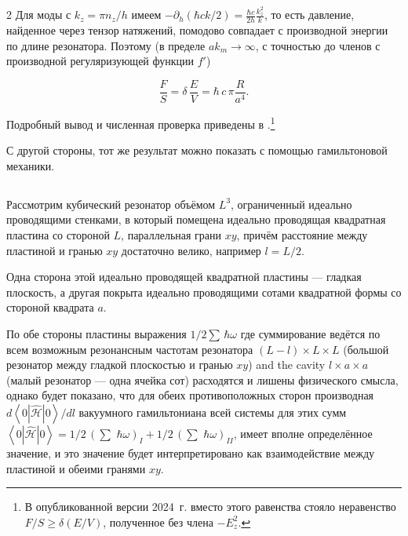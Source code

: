 \documentclass[twoside, 10pt]{article}
\def\myvspacebeforesubsection{-2.0mm}
\def\myvspaceaftersubsection{-2.5mm}
\begin{document}
\begin{multicols}{2}
Для моды с \(k_z=\pi n_z/h\) имеем
\(-\partial_h(\hbar ck/2)=\frac{\hbar c}{2h}\frac{k_z^2}{k}\), то есть давление, найденное через
тензор натяжений, помодово совпадает с производной энергии по длине резонатора. Поэтому (в пределе
\(ak_m\to\infty\), с точностью до членов с производной регуляризующей функции \(f'\))

\begin{equation}\frac{F}{S} = \delta\,\frac{E}{V} = \hbar\,c\, \pi\frac{R}{a^4}.\end{equation}

Подробный вывод и численная проверка приведены в \cite{Drozdov2026Noether, VerifNotebook}.\footnote{В опубликованной версии 2024~г. вместо этого равенства стояло неравенство \(F/S\ge\delta(E/V)\), полученное без члена \(-E_z^2\).}

С другой стороны, тот же результат можно показать с помощью гамильтоновой механики.


\vspace{\myvspacebeforesubsection}
    \subsection*{} \label{appendix-c.-hamiltonian-mechanics-approach}
\vspace{\myvspaceaftersubsection}


\setcounter{equation}{0}
\renewcommand{\theequation}{C.\arabic{equation}}

    Рассмотрим кубический резонатор объёмом \(L^3\), ограниченный идеально
проводящими стенками, в который помещена идеально проводящая квадратная пластина со стороной
\(L\), параллельная грани \(xy\), причём расстояние между пластиной и гранью \(xy\) достаточно велико, например \(l = L/2\).

Одна сторона этой идеально проводящей квадратной пластины — гладкая плоскость, а
другая покрыта идеально проводящими сотами квадратной формы со стороной квадрата \(a\).

По обе стороны пластины выражения \(1\big/2\sum\,\hbar\omega\)
где суммирование ведётся по всем возможным резонансным частотам резонатора \(\left(L-l\right)\times L\times L\) (большой резонатор между гладкой плоскостью и гранью \(xy\)) and the cavity \(l\times a\times a\) (малый резонатор — одна ячейка сот) расходятся и лишены физического смысла, однако будет показано, что для обеих противоположных сторон производная \({d\left<0|\hat{\mathcal{H}}|0\right>}\big/{dl}\) вакуумного гамильтониана всей системы для этих сумм
\(\left<0|\hat{\mathcal{H}}|0\right> = 1\big/2\,\left(\sum\,\,\hbar\omega\right)_{I} + 1\big/2\,\left(\sum\,\,\hbar\omega\right)_{II}\),
имеет вполне определённое значение, и это значение будет интерпретировано как взаимодействие между пластиной и обеими гранями \(xy\).


\end{multicols}
\end{document}
